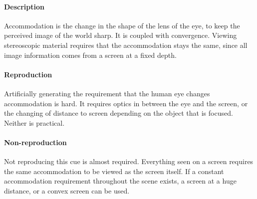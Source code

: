 \paragraph{Description}
Accommodation is the change in the shape of the lens of the eye, to keep the perceived image of the world sharp\cite{accommodation}. It is coupled with convergence. Viewing stereoscopic material requires that the accommodation stays the same, since all image information comes from a screen at a fixed depth.

\paragraph{Reproduction}
Artificially generating the requirement that the human eye changes accommodation is hard. It requires optics in between the eye and the screen, or the changing of distance to screen depending on the object that is focused. Neither is practical.

\paragraph{Non-reproduction}
Not reproducing this cue is almost required. Everything seen on a screen requires the same accommodation to be viewed as the screen itself. If a constant accommodation requirement throughout the scene exists, a screen at a huge distance, or a convex screen can be used.
